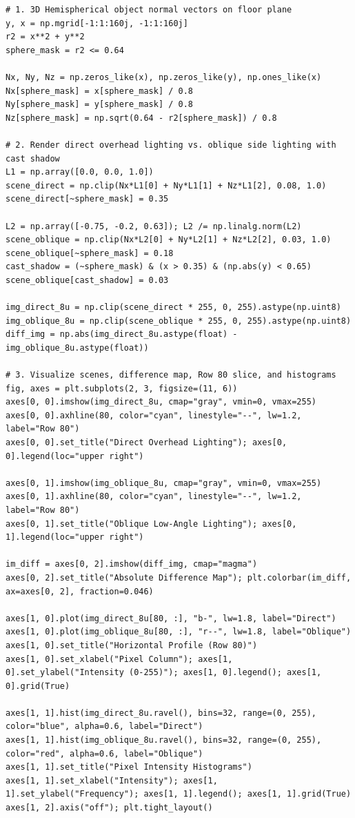 \documentclass[12pt]{article}
\begin{document}
\begin{lstlisting}[style=code]
# 1. 3D Hemispherical object normal vectors on floor plane
y, x = np.mgrid[-1:1:160j, -1:1:160j]
r2 = x**2 + y**2
sphere_mask = r2 <= 0.64

Nx, Ny, Nz = np.zeros_like(x), np.zeros_like(y), np.ones_like(x)
Nx[sphere_mask] = x[sphere_mask] / 0.8
Ny[sphere_mask] = y[sphere_mask] / 0.8
Nz[sphere_mask] = np.sqrt(0.64 - r2[sphere_mask]) / 0.8

# 2. Render direct overhead lighting vs. oblique side lighting with cast shadow
L1 = np.array([0.0, 0.0, 1.0])
scene_direct = np.clip(Nx*L1[0] + Ny*L1[1] + Nz*L1[2], 0.08, 1.0)
scene_direct[~sphere_mask] = 0.35

L2 = np.array([-0.75, -0.2, 0.63]); L2 /= np.linalg.norm(L2)
scene_oblique = np.clip(Nx*L2[0] + Ny*L2[1] + Nz*L2[2], 0.03, 1.0)
scene_oblique[~sphere_mask] = 0.18
cast_shadow = (~sphere_mask) & (x > 0.35) & (np.abs(y) < 0.65)
scene_oblique[cast_shadow] = 0.03

img_direct_8u = np.clip(scene_direct * 255, 0, 255).astype(np.uint8)
img_oblique_8u = np.clip(scene_oblique * 255, 0, 255).astype(np.uint8)
diff_img = np.abs(img_direct_8u.astype(float) - img_oblique_8u.astype(float))

# 3. Visualize scenes, difference map, Row 80 slice, and histograms
fig, axes = plt.subplots(2, 3, figsize=(11, 6))
axes[0, 0].imshow(img_direct_8u, cmap="gray", vmin=0, vmax=255)
axes[0, 0].axhline(80, color="cyan", linestyle="--", lw=1.2, label="Row 80")
axes[0, 0].set_title("Direct Overhead Lighting"); axes[0, 0].legend(loc="upper right")

axes[0, 1].imshow(img_oblique_8u, cmap="gray", vmin=0, vmax=255)
axes[0, 1].axhline(80, color="cyan", linestyle="--", lw=1.2, label="Row 80")
axes[0, 1].set_title("Oblique Low-Angle Lighting"); axes[0, 1].legend(loc="upper right")

im_diff = axes[0, 2].imshow(diff_img, cmap="magma")
axes[0, 2].set_title("Absolute Difference Map"); plt.colorbar(im_diff, ax=axes[0, 2], fraction=0.046)

axes[1, 0].plot(img_direct_8u[80, :], "b-", lw=1.8, label="Direct")
axes[1, 0].plot(img_oblique_8u[80, :], "r--", lw=1.8, label="Oblique")
axes[1, 0].set_title("Horizontal Profile (Row 80)")
axes[1, 0].set_xlabel("Pixel Column"); axes[1, 0].set_ylabel("Intensity (0-255)"); axes[1, 0].legend(); axes[1, 0].grid(True)

axes[1, 1].hist(img_direct_8u.ravel(), bins=32, range=(0, 255), color="blue", alpha=0.6, label="Direct")
axes[1, 1].hist(img_oblique_8u.ravel(), bins=32, range=(0, 255), color="red", alpha=0.6, label="Oblique")
axes[1, 1].set_title("Pixel Intensity Histograms")
axes[1, 1].set_xlabel("Intensity"); axes[1, 1].set_ylabel("Frequency"); axes[1, 1].legend(); axes[1, 1].grid(True)
axes[1, 2].axis("off"); plt.tight_layout()
\end{lstlisting}
\end{document}
